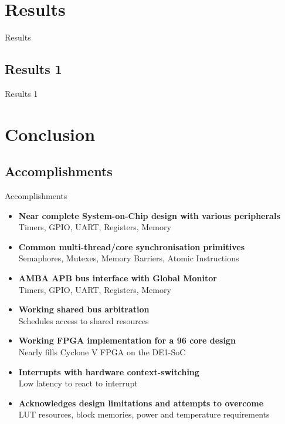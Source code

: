 \documentclass[aspectratio=169]{beamer}
\begin{document}
\section{Results}
\frame{\tableofcontents[currentsection, subsectionstyle=show/show/hide]}
\begin{frame}{Results}
\end{frame}
\subsection{Results 1}
\begin{frame}{Results 1}
\end{frame}

\section{Conclusion}
\frame{\tableofcontents[currentsection, subsectionstyle=show/show/hide]}

\subsection{Accomplishments}
\begin{frame}{Accomplishments}
\begin{itemize}
    \item \textbf{Near complete System-on-Chip design with various peripherals}\\
    Timers, GPIO, UART, Registers, Memory
    
    \item \textbf{Common multi-thread/core synchronisation primitives}\\
    Semaphores, Mutexes, Memory Barriers, Atomic Instructions
    
    \item \textbf{AMBA APB bus interface with Global Monitor}\\
    Timers, GPIO, UART, Registers, Memory
    
    \item \textbf{Working shared bus arbitration}\\
    Schedules access to shared resources
    
    \item \textbf{Working FPGA implementation for a 96 core design}\\
    Nearly fills Cyclone V FPGA on the DE1-SoC
    
    \item \textbf{Interrupts with hardware context-switching}\\
    Low latency to react to interrupt
    
    \item \textbf{Acknowledges design limitations and attempts to overcome}\\
    LUT resources, block memories, power and temperature requirements
\end{itemize}
\end{frame}
\end{document}
